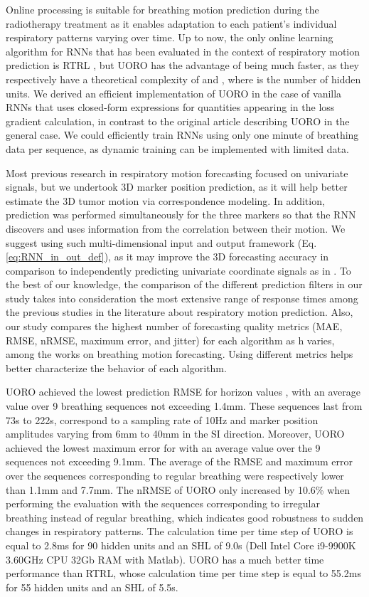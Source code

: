 \documentclass[twocolumn,a4paper]{svjour3} \sloppy          \smartqed
\begin{document}
Online processing is suitable for breathing motion prediction during the radiotherapy treatment as it enables adaptation to each patient's individual respiratory patterns varying over time. Up to now, the only online learning algorithm for RNNs that has been evaluated in the context of respiratory motion prediction is RTRL \cite{mafi2020real, POHL2021101941}, but UORO has the advantage of being much faster, as they respectively have a theoretical complexity of  and , where  is the number of hidden units. We derived an efficient implementation of UORO in the case of vanilla RNNs that uses closed-form expressions for quantities appearing in the loss gradient calculation, in contrast to the original article \citep{tallec2017unbiased} describing UORO in the general case. We could efficiently train RNNs using only one minute of breathing data per sequence, as dynamic training can be implemented with limited data. 

Most previous research in respiratory motion forecasting focused on univariate signals, but we undertook 3D marker position prediction, as it will help better estimate the 3D tumor motion via correspondence modeling. In addition, prediction was performed simultaneously for the three markers so that the RNN discovers and uses information from the correlation between their motion. We suggest using such multi-dimensional input and output framework (Eq. \ref{eq:RNN_in_out_def}), as it may improve the 3D forecasting accuracy in comparison to independently predicting univariate coordinate signals as in \cite{kai2018prediction, jiang2019prediction}. To the best of our knowledge, the comparison of the different prediction filters in our study takes into consideration the most extensive range of response times  among the previous studies in the literature about respiratory motion prediction. Also, our study compares the highest number of forecasting quality metrics (MAE, RMSE, nRMSE, maximum error, and jitter) for each algorithm as h varies, among the works on breathing motion forecasting. Using different metrics helps better characterize the behavior of each algorithm.

UORO achieved the lowest prediction RMSE for horizon values , with an average value over 9 breathing sequences not exceeding 1.4mm. These sequences last from 73s to 222s, correspond to a sampling rate of 10Hz and marker position amplitudes varying from 6mm to 40mm in the SI direction. Moreover, UORO achieved the lowest maximum error for  with an average value over the 9 sequences not exceeding 9.1mm. The average of the RMSE and maximum error over the sequences corresponding to regular breathing were respectively lower than 1.1mm and 7.7mm. The nRMSE of UORO only increased by 10.6\% when performing the evaluation with the sequences corresponding to irregular breathing instead of regular breathing, which indicates good robustness to sudden changes in respiratory patterns. The calculation time per time step of UORO is equal to 2.8ms for 90 hidden units and an SHL of 9.0s (Dell Intel Core i9-9900K 3.60GHz CPU 32Gb RAM with Matlab). UORO has a much better time performance than RTRL, whose calculation time per time step is equal to 55.2ms for 55 hidden units and an SHL of 5.5s.
\end{document}
